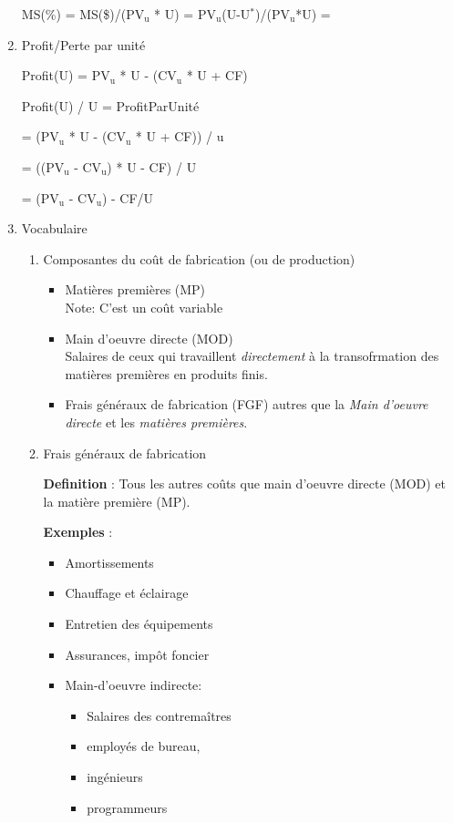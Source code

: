 \documentclass[11pt]{article}
\begin{document}
\begin{enumerate}
MS(\%) = MS(\$)/(PV\(_{\text{u}}\) * U) = PV\(_{\text{u}}\)(U-U\(^{\text{*}}\))/(PV\(_{\text{u}}\)*U) = 

\item Profit/Perte par unité
\label{sec:orgc7f0d54}

Profit(U) = PV\(_{\text{u}}\) * U - (CV\(_{\text{u}}\) * U + CF)

Profit(U) / U = ProfitParUnité

= (PV\(_{\text{u}}\) * U - (CV\(_{\text{u}}\) * U + CF)) / u

= ((PV\(_{\text{u}}\) - CV\(_{\text{u}}\)) * U - CF) / U

= (PV\(_{\text{u}}\) - CV\(_{\text{u}}\)) - CF/U



\item Vocabulaire
\label{sec:orgb0a93ef}
\begin{enumerate}
\item Composantes du coût de fabrication (ou de production)
\label{sec:org747c1e7}

\begin{itemize}
\item Matières premières (MP) \\
Note: C'est un coût variable
\item Main d'oeuvre directe (MOD) \\
Salaires de ceux qui travaillent \emph{directement} à la transofrmation des
matières premières en produits finis.
\item Frais généraux de fabrication (FGF) autres que la \emph{Main d'oeuvre directe} et les
\emph{matières premières}.
\end{itemize}

\item Frais généraux de fabrication
\label{sec:org55cd433}

\textbf{Definition} : Tous les autres coûts que main d'oeuvre directe (MOD) et la
matière première (MP).

\textbf{Exemples} : 
\begin{itemize}
\item Amortissements
\item Chauffage et éclairage
\item Entretien des équipements
\item Assurances, impôt foncier
\item Main-d'oeuvre indirecte: 
\begin{itemize}
\item Salaires des contremaîtres
\item employés de bureau,
\item ingénieurs
\item programmeurs
\end{itemize}
\end{itemize}


\end{enumerate}
\end{enumerate}
\end{document}
